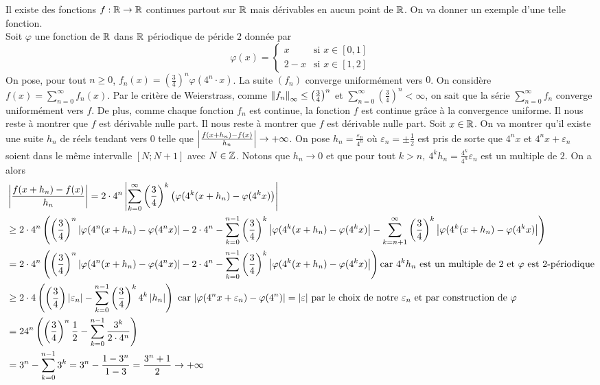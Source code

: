 \begin{exemple}
    Il existe des fonctions $f:\mathbb{R}\to\mathbb{R}$ continues partout sur $\mathbb{R}$ mais dérivables en aucun point de $\mathbb{R}$. On va donner un exemple d'une telle fonction. \\
    Soit $\varphi$ une fonction de $\mathbb{R}$ dans $\mathbb{R}$ périodique de péride $2 $ donnée par $$\varphi(x) = \begin{cases}
        x &\text{si $x\in [0,1]$}\\
        2 - x&\text{si $x\in[1,2]$}
    \end{cases}$$
    On pose, pour tout $n\ge0$, $f_n(x) = \left(\frac34\right)^n\varphi(4^n\cdot x)$. La suite $(f_n)$ converge uniformément vers $0$. On considère $f(x) = \sum_{n=0}^\infty f_n(x)$. Par le critère de Weierstrass, comme $\left\| f_n \right\|_\infty\le\left(\frac34\right)^n$ et $\sum_{n=0}^\infty\left(\frac34\right)^n<\infty$, on sait que la série $\sum_{n=0}^\infty f_n$ converge uniformément vers $f$. De plus, comme chaque fonction $f_n$ est continue, la fonction $f$ est continue grâce à la convergence uniforme. Il nous reste à montrer que $f$ est dérivable nulle part. Il nous reste à montrer que $f$ est dérivable nulle part. Soit $x\in\mathbb{R}$. On va montrer qu'il existe une suite $h_n$ de réels tendant vers $0$ telle que $\left| \frac{f(x+h_n)-f(x)}{h_n} \right|\to+\infty$. On pose $h_n = \frac{\varepsilon_n}{4^n}$ où $\varepsilon_n = \pm\frac{1}{2}$ est pris de sorte que $4^nx$ et $4^nx+\varepsilon_n$ soient dans le même intervalle $[N;N+1]$ avec $N\in\mathbb{Z}$. Notons que $h_n\to 0$ et que pour tout $k>n,\ 4^kh_n = \frac{4^k}{4^n}\varepsilon_n$ est un multiple de $2$. On a alors 
    \begin{align*}
        &\left| \frac{f(x+h_n)-f(x)}{h_n} \right|= 2\cdot 4^n\left| \sum_{k=0}^\infty\left(\frac34\right)^k\left(\varphi(4^k(x+h_n)-\varphi(4^kx)\right) \right|\\
        &\ge 2\cdot 4^n\left(\left(\frac34\right)^n\left| \varphi(4^n(x+h_n)-\varphi(4^nx) \right|-2\cdot 4^n-\sum_{k=0}^{n-1}\left(\frac34\right)^k\left| \varphi(4^k(x+h_n)-\varphi(4^kx) \right|- \sum_{k=n+1}^{\infty}\left(\frac34\right)^k\left| \varphi(4^k(x+h_n)-\varphi(4^kx) \right|\right)\\
        &=2\cdot 4^n\left(\left(\frac34\right)^n\left| \varphi(4^n(x+h_n)-\varphi(4^nx) \right|-2\cdot 4^n-\sum_{k=0}^{n-1}\left(\frac34\right)^k\left| \varphi(4^k(x+h_n)-\varphi(4^kx) \right|\right)\text{car $4^kh_n$ est un multiple de $2$ et $\varphi$ est $2$-périodique}\\
       &\ge2\cdot4\left(\left(\frac34\right)\left| \varepsilon_n \right|-\sum_{k=0}^{n-1}\left(\frac34\right)^k4^k\left| h_n \right|\right) \text{ car $\left| \varphi(4^nx+\varepsilon_n)-\varphi(4^n) \right| = \left| \varepsilon \right|$ par le choix de notre $\varepsilon_n$ et par construction de $\varphi$}\\
       &= 24^n\left(\left(\frac{3}{4}\right)^n\frac{1}{2} - \sum_{k=0}^{n-1}\frac{3^k}{2\cdot4^n}\right)\\
       &= 3^n-\sum_{k=0}^{n-1}3^k = 3^n-\frac{1-3^n}{1-3} = \frac{3^n+1}2\to +\infty
    \end{align*}
\end{exemple}
